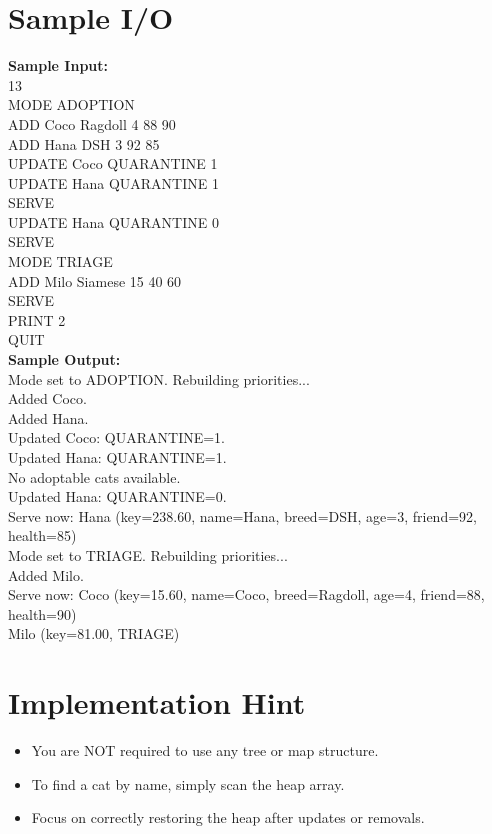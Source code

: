 \documentclass[11pt]{article}
\begin{document}
\section*{Sample I/O}
\begin{codebox}
\footnotesize
\textbf{Sample Input:} \\
13 \\
MODE ADOPTION \\
ADD Coco Ragdoll 4 88 90 \\
ADD Hana DSH 3 92 85 \\
UPDATE Coco QUARANTINE 1 \\
UPDATE Hana QUARANTINE 1 \\
SERVE \\
UPDATE Hana QUARANTINE 0 \\
SERVE \\
MODE TRIAGE \\
ADD Milo Siamese 15 40 60 \\
SERVE \\
PRINT 2 \\
QUIT \\
\vspace{5pt}
\textbf{Sample Output:} \\
Mode set to ADOPTION. Rebuilding priorities... \\
Added Coco. \\
Added Hana. \\
Updated Coco: QUARANTINE=1. \\
Updated Hana: QUARANTINE=1. \\
No adoptable cats available. \\
Updated Hana: QUARANTINE=0. \\
Serve now: Hana (key=238.60, name=Hana, breed=DSH, age=3, friend=92, health=85) \\
Mode set to TRIAGE. Rebuilding priorities... \\
Added Milo. \\
Serve now: Coco (key=15.60, name=Coco, breed=Ragdoll, age=4, friend=88, health=90) \\
\relax[1] Milo (key=81.00, TRIAGE)
\end{codebox}

\section*{Implementation Hint}
\begin{itemize}
    \item You are NOT required to use any tree or map structure.
    \item To find a cat by name, simply scan the heap array.
    \item Focus on correctly restoring the heap after updates or removals.
\end{itemize}
\end{document}
